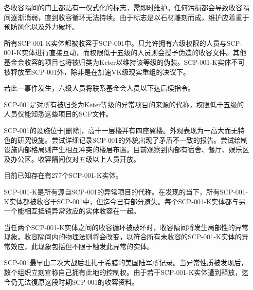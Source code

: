 各收容隔间的门上都贴有一仪式化的标志，需即时维护。任何污损都会导致收容隔间逐渐消弱，直到收容循环无法持续。由于标志是以石材雕刻而成，维护应着重于预防风化以及外力破坏。

所有SCP-001-K实体都被收容于SCP-001中。只允许拥有六级权限的人员与SCP-001-K实体进行直接互动，而权限低于五级的人员则会授予伪造的收容文件。其他基金会收容的项目也将被归类为Keter以维持该等级的伪装。SCP-001-K实体不可被释放至SCP-001外，除非是在加速VK级现实重组的决议下。

若此一事件发生，六级人员将联系基金会人员以下达后续指令。

SCP-001是对所有被归类为Keter等级的异常项目的来源的代称，权限低于五级的人员仅能知悉这些项目的SCP文件。

SCP-001的设施位于[删除]，高十一层楼并有四座翼楼。外观表现为一高大而无特色的研究设施。尝试详细记录SCP-001的外貌出现了矛盾不一致的报告。尝试绘制设施内部格局则产生相互冲突的楼层布置。目前观察到内部有宿舍、餐厅、娱乐区及办公区。收容隔间仅对五级以上人员开放。

目前已知存在有277个SCP-001-K实体。

SCP-001-K是所有源自SCP-001的异常项目的代称。在发现的当下，所有SCP-001-K实体都被收容于SCP-001中，但迄今已有部分遗失。每个SCP-001-K实体都与另一个能相互抵销异常效应的实体收容在一起。

当任两个SCP-001-K实体之间的收容循环被破坏时，收容隔间将发生局部性的异常现象。收容隔间内的物理法则将会改变，以符合所有未收容的SCP-001-K实体的异常效应，此现象包括但不限于触发此异常的实体。

SCP-001最早由二次大战后驻扎于希腊的美国陆军所记录。当异常性质被发现后，数个组织立刻宣称自己拥有此地的控制权。由于若干SCP-001-K实体遭到释放，迄今仍无法復原这段时期SCP-001的收容资料。


